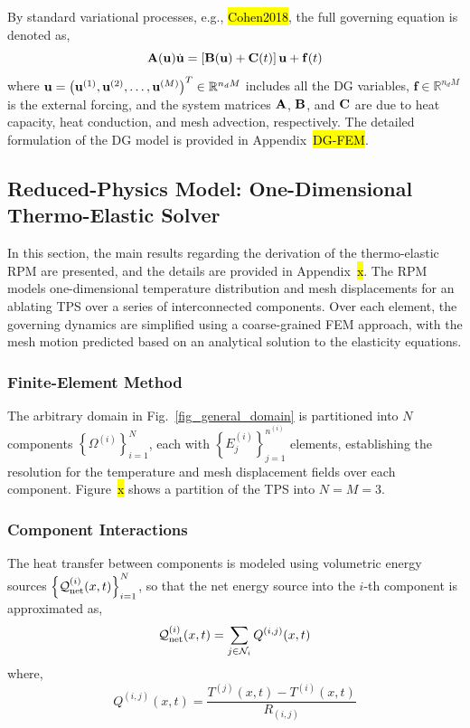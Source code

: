 By standard variational processes, e.g., \hl{Cohen2018}, the full governing equation is denoted as,
\begin{equation}
    \mathbf{A}(\mathbf{u})\dot{\mathbf{u}} = \left[\mathbf{B}(\mathbf{u}) + \mathbf{C}(t)\right]\mathbf{u} + \mathbf{f}(t)\label{eqn_energy_fem}
\end{equation}
where $\mathbf{u} = \left(\mathbf{u}^{(1)}, \mathbf{u}^{(2)}, \ldots, \mathbf{u}^{(M)}\right)^T\in\mathbb{R}^{n_dM}$ includes all the DG variables, $\mathbf{f}\in\mathbb{R}^{n_dM}$ is the external forcing, and the system matrices $\mathbf{A}$, $\mathbf{B}$, and $\mathbf{C}$ are due to heat capacity, heat conduction, and mesh advection, respectively. The detailed formulation of the DG model is provided in Appendix~\hl{DG-FEM}.

\subsection{Reduced-Physics Model: One-Dimensional Thermo-Elastic Solver}

In this section, the main results regarding the derivation of the thermo-elastic RPM are presented, and the details are provided in Appendix~\hl{x}. The RPM models one-dimensional temperature distribution and mesh displacements for an ablating TPS over a series of interconnected components. Over each element, the governing dynamics are simplified using a coarse-grained FEM approach, with the mesh motion predicted based on an analytical solution to the elasticity equations.

\subsubsection{Finite-Element Method}

The arbitrary domain in Fig.~\ref{fig_general_domain} is partitioned into $N$ components $\left\{\Omega^{(i)}\right\}_{i=1}^{N}$, each with $\left\{E^{(i)}_j\right\}_{j=1}^{n^{(i)}}$ elements, establishing the resolution for the temperature and mesh displacement fields over each component. Figure~\hl{x} shows a partition of the TPS into $N=M=3$. 

\subsubsection{Component Interactions}

The heat transfer between components is modeled using volumetric energy sources $\left\{\mathcal{Q}_{\text{net}}^{(i)}(x,t)\right\}_{i=1}^{N}$, so that the net energy source into the $i$-th component is approximated as,
\begin{equation}
    \mathcal{Q}_{\text{net}}^{(i)}(x,t) = \sum_{j\in\mathcal{N}_i}Q^{(i,j)}(x,t)\label{eqn_net_volumetric_energy}
\end{equation}
where,
\begin{equation}
    Q^{(i,j)}(x,t) = \frac{T^{(j)}(x,t) - T^{(i)}(x,t)}{R_{(i,j)}}
\end{equation}


